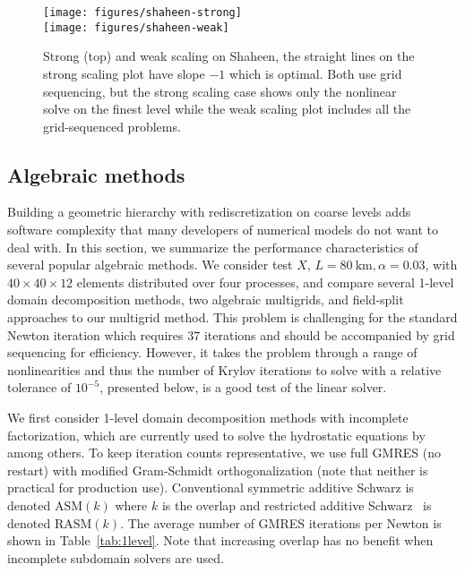 \documentclass[3p]{elsarticle}
\newcommand{\ASM}{\mathrm{ASM}}
\newcommand{\RASM}{\mathrm{RASM}}
\begin{document}
\begin{figure}
  \centering\caption{Strong (top) and weak scaling on Shaheen, the straight lines on the strong scaling plot have slope $-1$ which is optimal.  Both use grid sequencing, but the strong scaling case shows only the nonlinear solve on the finest level while the weak scaling plot includes all the grid-sequenced problems.}\label{fig:shaheen}
  \texttt{[image: figures/shaheen-strong]} \\
  \texttt{[image: figures/shaheen-weak]}
\end{figure}

\subsection{Algebraic methods}\label{sec:1level}
Building a geometric hierarchy with rediscretization on coarse levels adds software complexity that many developers of numerical models do not want to deal with.  In this section, we summarize the performance characteristics of several popular algebraic methods.  We consider test $X$, $L = \SI{80}{\kilo\metre}, \alpha=0.03$, with $40\times 40\times 12$ elements distributed over four processes, and compare several 1-level domain decomposition methods, two algebraic multigrids, and field-split approaches to our multigrid method.  This problem is challenging for the standard Newton iteration which requires 37 iterations and should be accompanied by grid sequencing for efficiency. However, it takes the problem through a range of nonlinearities and thus the number of Krylov iterations to solve with a relative tolerance of $10^{-5}$, presented below, is a good test of the linear solver.

We first consider 1-level domain decomposition methods with incomplete factorization, which are currently used to solve the hydrostatic equations by \cite{seacism,issm} among others.  To keep iteration counts representative, we use full GMRES (no restart) with modified Gram-Schmidt orthogonalization (note that neither is practical for production use).  Conventional symmetric additive Schwarz is denoted $\ASM(k)$ where $k$ is the overlap and restricted additive Schwarz~\cite{cai1999restricted} is denoted $\RASM(k)$.  The average number of GMRES iterations per Newton is shown in Table~\ref{tab:1level}.  Note that increasing overlap has no benefit when incomplete subdomain solvers are used.
\end{document}
